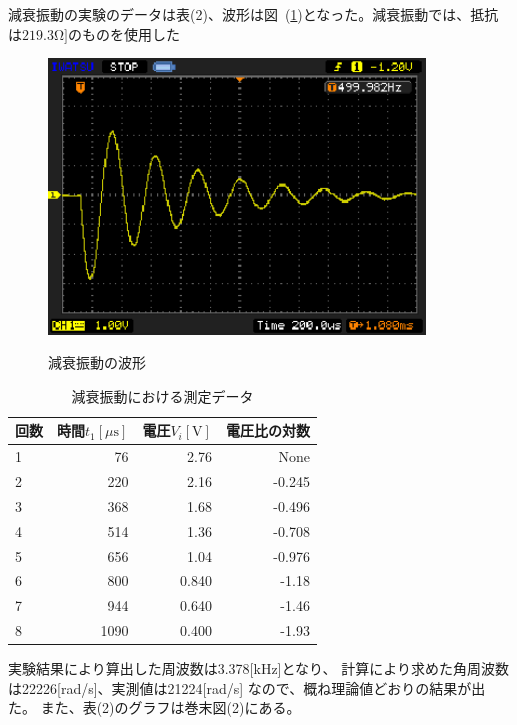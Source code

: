\documentclass[a4j,10pt]{jarticle}
\newcommand{\Figref}[1]{図~(\ref{#1})}
\begin{document}
減衰振動の実験のデータは表(2)、波形は\Figref{Gensui}となった。減衰振動では、抵抗は$219.3\mathrm \Omega]$のものを使用した
\begin{figure}[h]
\begin{center}
\includegraphics[width=10cm]{freq.eps}
\label{Gensui}
\caption{減衰振動の波形}
\end{center}
\end{figure}
\begin{table}[h]
\begin{center}
\label{GensuiD}
\caption{減衰振動における測定データ}
\begin{tabular}{|l|r|r|r|}
\hline
回数 & 時間$t_{1}[\mu \mathrm s]$ & 電圧$V_{i}[\mathrm V]$ & 電圧比の対数 \\ \hline \hline
1 & 76 & 2.76 & None \\ \hline
2 & 220 & 2.16 & -0.245 \\ \hline
3 & 368 & 1.68 & -0.496 \\ \hline
4 & 514 & 1.36 & -0.708 \\ \hline
5 & 656 & 1.04 & -0.976 \\ \hline
6 & 800 & 0.840 & -1.18 \\ \hline
7 & 944 & 0.640 & -1.46 \\ \hline
8 & 1090 & 0.400 &-1.93 \\ \hline
\end{tabular}
\end{center}
\end{table}

実験結果により算出した周波数は3.378[kHz]となり、
計算により求めた角周波数は22226[rad/s]、実測値は21224[rad/s]
なので、概ね理論値どおりの結果が出た。
また、表(2)のグラフは巻末図(2)にある。
\end{document}
